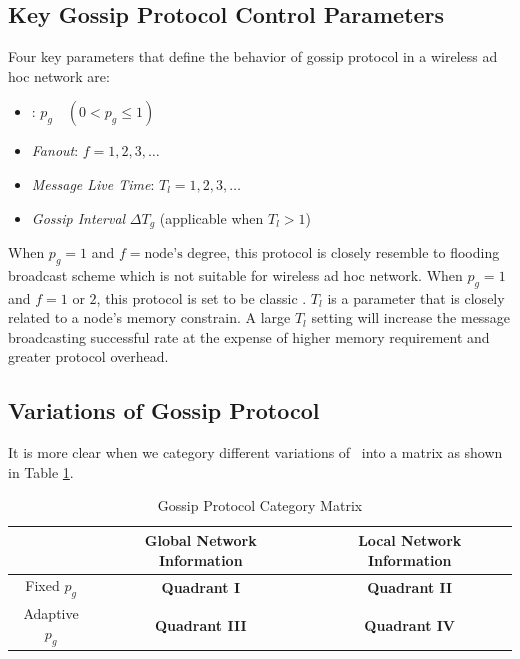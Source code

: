 
\subsection{Key Gossip Protocol Control Parameters}
Four key parameters that define the behavior of gossip protocol in a wireless ad hoc network are: 

\begin{itemize}
	\item \emph{\pog}: $p_g  \quad (0 < p_g \leq 1)$
	\item \emph{Fanout}: $f = 1, 2, 3, \ldots$
	\item \emph{Message Live Time}: $T_l = 1,2,3, \ldots$
	\item \emph{Gossip Interval} $\Delta T_g$ (applicable when $T_l > 1$)
\end{itemize}

When $p_g = 1$ and $f = \mbox{node's degree}$, this protocol is closely resemble to flooding broadcast scheme which is not suitable for wireless ad hoc network. When $p_g = 1$ and $f = 1 \mbox{ or } 2$, this protocol is set to be classic \gp. $T_l$ is a parameter that is closely related to a node's memory constrain. A large $T_l$ setting will increase the message broadcasting successful rate at the expense of higher memory requirement and greater protocol overhead. 

\subsection{Variations of Gossip Protocol}

It is more clear when we category different variations of \gp ~into a matrix as shown in Table \ref{table:matrix}. 

\begin{table}[h]
	\centering
	\caption{Gossip Protocol Category Matrix}
	\label{table:matrix}
	\centering
	\begin{tabular}{|c|c|c|}
		\hline 
		& Global Network Information & Local Network Information \\ 
		\hline 
		Fixed  $p_g$ & \textbf{Quadrant I} & \textbf{Quadrant II} \\ 
		\hline 
		Adaptive $p_g$ & \textbf{Quadrant III} & \textbf{Quadrant IV} \\ 
		\hline 
	\end{tabular} 
\end{table}

